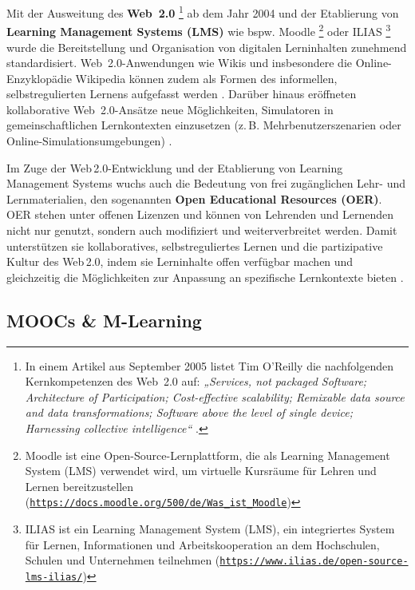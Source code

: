 Mit der Ausweitung des \textbf{Web~2.0} \footnote{In einem Artikel aus September 2005 listet Tim O'Reilly die nachfolgenden Kernkompetenzen des Web~2.0 auf: \textit{„Services, not packaged Software; Architecture of Participation; Cost-effective scalability; Remixable data source and data transformations; Software above the level of single device; Harnessing collective intelligence“} \cite{oreilly_what_2005}.} ab dem Jahr 2004 und der Etablierung von \textbf{Learning Management Systems (LMS)} wie bspw. Moodle \footnote{Moodle ist eine Open-Source-Lernplattform, die als Learning Management System (LMS) verwendet wird, um virtuelle Kursräume für Lehren und Lernen bereitzustellen (\href{https://docs.moodle.org/500/de/Was_ist_Moodle}{\nolinkurl{https://docs.moodle.org/500/de/Was_ist_Moodle}})} oder ILIAS \footnote{ILIAS ist ein Learning Management System (LMS), ein integriertes System für Lernen, Informationen und Arbeitskooperation an dem Hochschulen, Schulen und Unternehmen teilnehmen (\href{https://www.ilias.de/open-source-lms-ilias/}{\nolinkurl{https://www.ilias.de/open-source-lms-ilias/}})} wurde die Bereitstellung und Organisation von digitalen Lerninhalten zunehmend standardisiert. Web~2.0-Anwendungen wie Wikis und insbesondere die Online-Enzyklopädie Wikipedia können zudem als Formen des informellen, selbstregulierten Lernens aufgefasst werden \parencite[S.~14]{niegemann_kompendium_2008}. Darüber hinaus eröffneten kollaborative Web~2.0-Ansätze neue Möglichkeiten, Simulatoren in gemeinschaftlichen Lernkontexten einzusetzen (z.\,B. Mehrbenutzerszenarien oder Online-Simulationsumgebungen) \parencite[S.~129f]{gallagher_assessing_2007}.

Im Zuge der Web 2.0-Entwicklung und der Etablierung von Learning Management Systems wuchs auch die Bedeutung von frei zugänglichen Lehr- und Lernmaterialien, den sogenannten \textbf{Open Educational Resources (OER)}. OER stehen unter offenen Lizenzen und können von Lehrenden und Lernenden nicht nur genutzt, sondern auch modifiziert und weiterverbreitet werden. Damit unterstützen sie kollaboratives, selbstreguliertes Lernen und die partizipative Kultur des Web 2.0, indem sie Lerninhalte offen verfügbar machen und gleichzeitig die Möglichkeiten zur Anpassung an spezifische Lernkontexte bieten \parencites[S.~1]{unesco_guidelines_2011}[S.~194f]{fluhler_open_2024}.

\subsection{MOOCs \& M-Learning}

